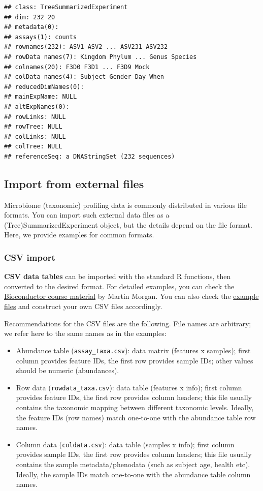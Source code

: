 \documentclass[
]{book}
\begin{document}
\begin{verbatim}
## class: TreeSummarizedExperiment 
## dim: 232 20 
## metadata(0):
## assays(1): counts
## rownames(232): ASV1 ASV2 ... ASV231 ASV232
## rowData names(7): Kingdom Phylum ... Genus Species
## colnames(20): F3D0 F3D1 ... F3D9 Mock
## colData names(4): Subject Gender Day When
## reducedDimNames(0):
## mainExpName: NULL
## altExpNames(0):
## rowLinks: NULL
## rowTree: NULL
## colLinks: NULL
## colTree: NULL
## referenceSeq: a DNAStringSet (232 sequences)
\end{verbatim}

\hypertarget{import-from-external-files}{%
\subsection{Import from external files}\label{import-from-external-files}}

Microbiome (taxonomic) profiling data is commonly distributed in
various file formats. You can import such external data files as a
(Tree)SummarizedExperiment object, but the details depend on the file
format. Here, we provide examples for common formats.

\hypertarget{csv-import}{%
\subsubsection{CSV import}\label{csv-import}}

\textbf{CSV data tables} can be imported with the standard R functions,
then converted to the desired format. For detailed examples, you can
check the \href{https://bioconductor.org/help/course-materials/2019/BSS2019/04_Practical_CoreApproachesInBioconductor.html}{Bioconductor course
material}
by Martin Morgan. You can also check the \href{https://github.com/microbiome/OMA/tree/master/data}{example
files} and
construct your own CSV files accordingly.

Recommendations for the CSV files are the following. File names are
arbitrary; we refer here to the same names as in the examples:

\begin{itemize}
\item
  Abundance table (\texttt{assay\_taxa.csv}): data matrix (features x
  samples); first column provides feature IDs, the first row provides
  sample IDs; other values should be numeric (abundances).
\item
  Row data (\texttt{rowdata\_taxa.csv}): data table (features x info); first
  column provides feature IDs, the first row provides column headers;
  this file usually contains the taxonomic mapping between different
  taxonomic levels. Ideally, the feature IDs (row names) match one-to-one with
  the abundance table row names.
\item
  Column data (\texttt{coldata.csv}): data table (samples x info); first
  column provides sample IDs, the first row provides column headers;
  this file usually contains the sample metadata/phenodata (such as
  subject age, health etc). Ideally, the sample IDs match one-to-one with
  the abundance table column names.
\end{itemize}
\end{document}
